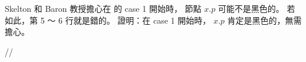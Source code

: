 \startEXERCISE
Skelton 和 Baron 教授擔心在  的 case 1 開始時，
節點 $x.p$ 可能不是黑色的。
若如此，第 5 ～ 6 行就是錯的。
證明：在 case 1 開始時， $x.p$ 肯定是黑色的，無需擔心。
\stopEXERCISE

\startANSWER
//
\stopANSWER
